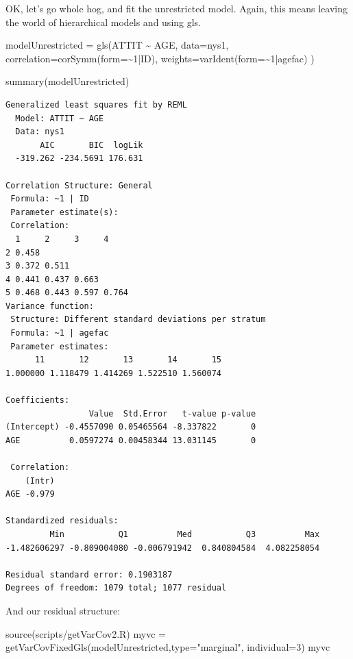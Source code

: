\documentclass[
  letterpaper,
  DIV=11,
  numbers=noendperiod]{scrreprt}
\newenvironment{Shaded}{\begin{snugshade}}{\end{snugshade}}
\newcommand{\AttributeTok}[1]{\textcolor[rgb]{0.49,0.56,0.16}{#1}}
\newcommand{\DecValTok}[1]{\textcolor[rgb]{0.25,0.63,0.44}{#1}}
\newcommand{\FunctionTok}[1]{\textcolor[rgb]{0.02,0.16,0.49}{#1}}
\newcommand{\NormalTok}[1]{\textcolor[rgb]{0.00,0.44,0.13}{#1}}
\newcommand{\OtherTok}[1]{\textcolor[rgb]{0.00,0.44,0.13}{#1}}
\newcommand{\SpecialCharTok}[1]{\textcolor[rgb]{0.25,0.44,0.63}{#1}}
\newcommand{\StringTok}[1]{\textcolor[rgb]{0.25,0.44,0.63}{#1}}
\begin{document}
OK, let's go whole hog, and fit the unrestricted model. Again, this
means leaving the world of hierarchical models and using gls.

\begin{Shaded}
\begin{Highlighting}[]
\NormalTok{modelUnrestricted }\OtherTok{=} \FunctionTok{gls}\NormalTok{(ATTIT }\SpecialCharTok{\textasciitilde{}}\NormalTok{ AGE, }
               \AttributeTok{data=}\NormalTok{nys1,}
               \AttributeTok{correlation=}\FunctionTok{corSymm}\NormalTok{(}\AttributeTok{form=}\SpecialCharTok{\textasciitilde{}}\DecValTok{1}\SpecialCharTok{|}\NormalTok{ID),}
               \AttributeTok{weights=}\FunctionTok{varIdent}\NormalTok{(}\AttributeTok{form=}\SpecialCharTok{\textasciitilde{}}\DecValTok{1}\SpecialCharTok{|}\NormalTok{agefac) )}


\FunctionTok{summary}\NormalTok{(modelUnrestricted)}
\end{Highlighting}
\end{Shaded}

\begin{verbatim}
Generalized least squares fit by REML
  Model: ATTIT ~ AGE 
  Data: nys1 
       AIC       BIC  logLik
  -319.262 -234.5691 176.631

Correlation Structure: General
 Formula: ~1 | ID 
 Parameter estimate(s):
 Correlation: 
  1     2     3     4    
2 0.458                  
3 0.372 0.511            
4 0.441 0.437 0.663      
5 0.468 0.443 0.597 0.764
Variance function:
 Structure: Different standard deviations per stratum
 Formula: ~1 | agefac 
 Parameter estimates:
      11       12       13       14       15 
1.000000 1.118479 1.414269 1.522510 1.560074 

Coefficients:
                 Value  Std.Error   t-value p-value
(Intercept) -0.4557090 0.05465564 -8.337822       0
AGE          0.0597274 0.00458344 13.031145       0

 Correlation: 
    (Intr)
AGE -0.979

Standardized residuals:
         Min           Q1          Med           Q3          Max 
-1.482606297 -0.809004080 -0.006791942  0.840804584  4.082258054 

Residual standard error: 0.1903187 
Degrees of freedom: 1079 total; 1077 residual
\end{verbatim}

And our residual structure:

\begin{Shaded}
\begin{Highlighting}[]
\FunctionTok{source}\NormalTok{(}\StringTok{\textquotesingle{}scripts/getVarCov2.R\textquotesingle{}}\NormalTok{)}
\NormalTok{myvc }\OtherTok{=} \FunctionTok{getVarCovFixedGls}\NormalTok{(modelUnrestricted,}\AttributeTok{type=}\StringTok{"marginal"}\NormalTok{, }\AttributeTok{individual=}\DecValTok{3}\NormalTok{)}
\NormalTok{myvc}
\end{Highlighting}
\end{Shaded}
\end{document}
